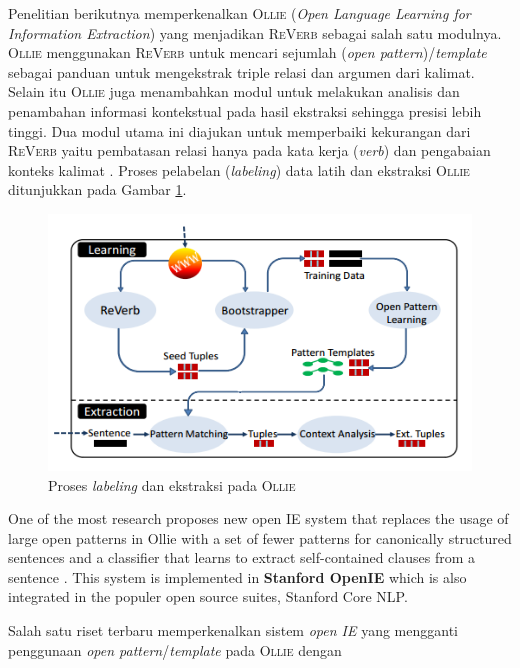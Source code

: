 Penelitian berikutnya memperkenalkan \textsc{Ollie} (\textit{Open Language Learning for Information Extraction}) \citep{schmitz2012open} yang menjadikan \textsc{ReVerb} sebagai salah satu modulnya. \textsc{Ollie} menggunakan \textsc{ReVerb} untuk mencari sejumlah (\textit{open pattern})/\textit{template} sebagai panduan untuk mengekstrak triple relasi dan argumen dari kalimat. Selain itu \textsc{Ollie} juga menambahkan modul untuk melakukan analisis dan penambahan informasi kontekstual pada hasil ekstraksi sehingga presisi lebih tinggi. Dua modul utama ini diajukan untuk memperbaiki kekurangan dari \textsc{ReVerb} yaitu pembatasan relasi hanya pada kata kerja (\textit{verb}) dan pengabaian konteks kalimat \citep{schmitz2012open}. Proses pelabelan (\textit{labeling}) data latih dan ekstraksi \textsc{Ollie} ditunjukkan pada Gambar \ref{fig_ollie_architecture}.

\begin{figure}
\centering
\includegraphics[scale=0.5]{../images/ollie_architecture.png}
\caption{Proses \textit{labeling} dan ekstraksi pada \textsc{Ollie}}
\label{fig_ollie_architecture}
\end{figure}

One of the most research proposes new open IE system that replaces the usage of large open patterns in Ollie \citep{schmitz2012open} with a set of fewer patterns for canonically structured sentences and a classifier that learns to extract self-contained clauses from a sentence \citep{angeli2015leveraging}. This system is implemented in \textbf{Stanford OpenIE} which is also integrated in the populer open source suites, Stanford Core NLP.

Salah satu riset terbaru memperkenalkan sistem \textit{open IE} yang mengganti penggunaan \textit{open pattern}/\textit{template} pada \textsc{Ollie} \citep{schmitz2012open} dengan 

